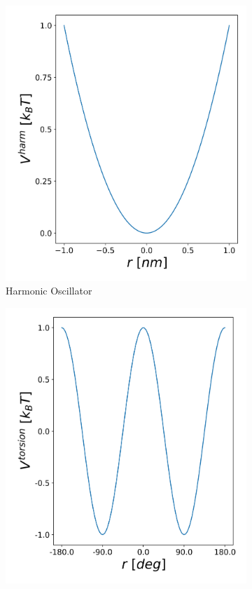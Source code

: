 \begin{figure}[h!]
    \centering
    \begin{subfigure}{0.45\textwidth}
        \includegraphics[width=\textwidth]{2_chapter_intro/fig/ForceField/harmOscV.png}
        \caption{Harmonic Oscillator}
	\label{sfig:ho}
    \end{subfigure}
        \begin{subfigure}{0.45\textwidth}
        \includegraphics[width=\textwidth]{2_chapter_intro/fig/ForceField/torsV.png}

\end{subfigure}
\end{figure}
